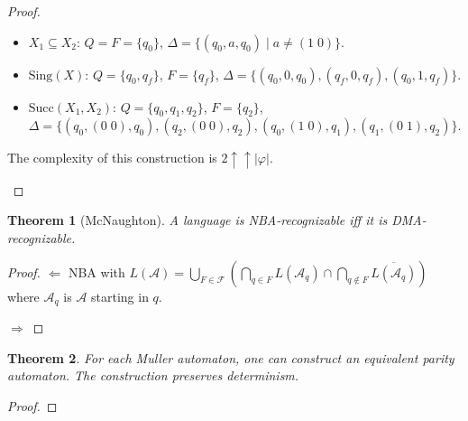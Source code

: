 \documentclass{article}
\newtheorem{theorem}{Theorem}
\begin{document}
\begin{proof}
\begin{description}
	\begin{itemize}
		\item $X_1 \subseteq X_2$: $Q = F = \{q_0\}$, $\Delta = \{(q_0, a, q_0) \mid a \neq (1 \; 0)\}$.
		\item $\text{Sing}(X)$: $Q = \{q_0, q_f\}$, $F = \{q_f\}$, $\Delta = \{(q_0, 0, q_0), (q_f, 0, q_f), (q_0, 1, q_f)\}$.
		\item $\text{Succ}(X_1, X_2)$: $Q = \{q_0, q_1, q_2\}$, $F = \{q_2\}$, \\
		$\Delta = \{ (q_0, (0 \; 0), q_0), (q_2, (0 \; 0), q_2), (q_0, (1 \; 0), q_1), (q_1, (0 \; 1), q_2)\}$.
	\end{itemize}
	
	The complexity of this construction is $2 \uparrow \uparrow |\varphi|$.
	\end{description}
\end{proof}


\vspace{1cm}
\begin{theorem}[McNaughton]
\label{nba_dma}
	A language is NBA-recognizable iff it is DMA-recognizable.
\end{theorem}
\begin{proof}
	$\bm{\Leftarrow}$ NBA with $L(\mathcal{A}) = \bigcup\limits_{F \in \mathcal{F}} \left( \bigcap\limits_{q \in F} L(\mathcal{A}_q) \cap \bigcap\limits_{q \notin F} \overline{L(\mathcal{A}_q)} \right)$ where $\mathcal{A}_q$ is $\mathcal{A}$ starting in $q$.
	
    $\bm{\Rightarrow}$ %
\end{proof}


\vspace{1cm}
\begin{theorem}
\label{muller_to_parity}
	For each Muller automaton, one can construct an equivalent parity automaton. The construction preserves determinism.
\end{theorem}
\begin{proof}
\end{proof}
\end{document}
